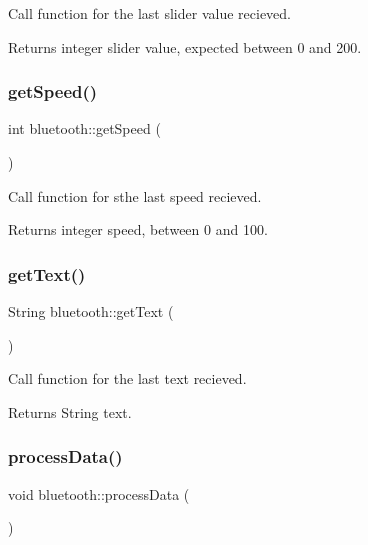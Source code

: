 Call function for the last slider value recieved. 

\begin{DoxyReturn}{Returns}
integer slider value, expected between 0 and 200. 
\end{DoxyReturn}
\mbox{\label{classbluetooth_a3c726cf32623b74120736330144e69c8}} 
\subsubsection{\texorpdfstring{getSpeed()}{getSpeed()}}
{\footnotesize\ttfamily int bluetooth\+::get\+Speed (\begin{DoxyParamCaption}{ }\end{DoxyParamCaption})}



Call function for sthe last speed recieved. 

\begin{DoxyReturn}{Returns}
integer speed, between 0 and 100. 
\end{DoxyReturn}
\mbox{\label{classbluetooth_a2ce571164eec6be3eb3bc7289c61f3dd}} 
\subsubsection{\texorpdfstring{getText()}{getText()}}
{\footnotesize\ttfamily String bluetooth\+::get\+Text (\begin{DoxyParamCaption}{ }\end{DoxyParamCaption})}



Call function for the last text recieved. 

\begin{DoxyReturn}{Returns}
String text. 
\end{DoxyReturn}
\mbox{\label{classbluetooth_abd10334bfe1bfe17de207578a2297654}} 
\subsubsection{\texorpdfstring{processData()}{processData()}}
{\footnotesize\ttfamily void bluetooth\+::process\+Data (\begin{DoxyParamCaption}{ }\end{DoxyParamCaption})}



